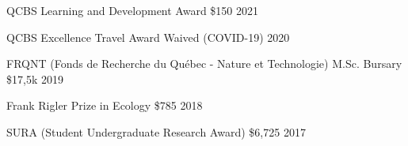 
\begin{cvhonors}

  \cvhonor
    {QCBS Learning and Development Award} %
    {} %
    {\$150} %
    {2021} %

  \cvhonor
    {QCBS Excellence Travel Award} %
    {} %
    {Waived (COVID-19)} %
    {2020} %

  \cvhonor
    {FRQNT (Fonds de Recherche du Québec - Nature et Technologie) M.Sc. Bursary} %
    {} %
    {\$17,5k} %
    {2019} %

  \cvhonor
    {Frank Rigler Prize in Ecology} %
    {} %
    {\$785} %
    {2018} %

  \cvhonor
    {SURA (Student Undergraduate Research Award)} %
    {} %
    {\$6,725} %
    {2017} %
    

\end{cvhonors}
